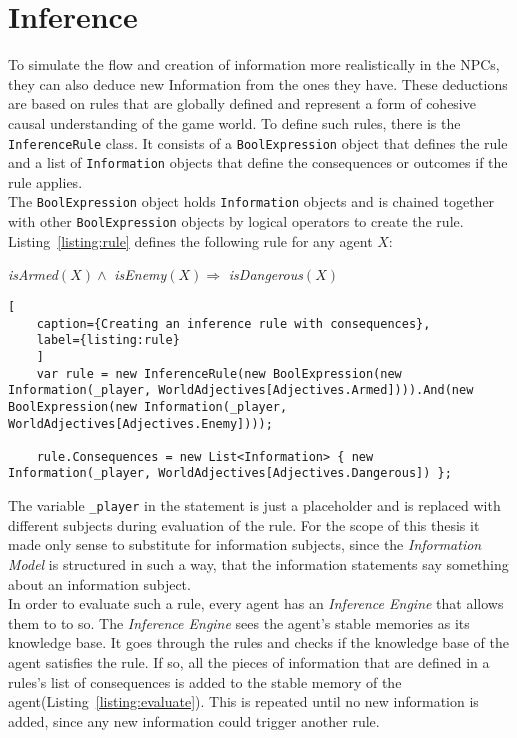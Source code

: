 \section{Inference}
To simulate the flow and creation of information more realistically in the NPCs, they can also deduce new Information from the ones they have. These deductions are based on rules that are globally defined and represent a form of cohesive causal understanding of the game world. To define such rules, there is the \verb|InferenceRule| class. It consists of a \verb|BoolExpression| object that defines the rule and a list of \verb|Information| objects that define the consequences or outcomes if the rule applies.\\
The \verb|BoolExpression| object holds \verb|Information| objects and is chained together with other \verb|BoolExpression| objects by logical operators to create the rule. Listing~\ref{listing:rule} defines the following rule for any agent $X$:
\begin{center}
	\textit{isArmed}$(X) \wedge $ \textit{isEnemy}$(X) \Rightarrow $ \textit{isDangerous}$(X)$ 
\end{center}
\begin{lstlisting}[
	caption={Creating an inference rule with consequences},
	label={listing:rule}
	]
	var rule = new InferenceRule(new BoolExpression(new Information(_player, WorldAdjectives[Adjectives.Armed]))).And(new BoolExpression(new Information(_player, WorldAdjectives[Adjectives.Enemy])));

	rule.Consequences = new List<Information> { new Information(_player, WorldAdjectives[Adjectives.Dangerous]) };
\end{lstlisting}
The variable \verb|_player| in the statement is just a placeholder and is replaced with different subjects during evaluation of the rule. For the scope of this thesis it made only sense to substitute for information subjects, since the \textit{Information Model} is structured in such a way, that the information statements say something about an information subject.\\
In order to evaluate such a rule, every agent has an \textit{Inference Engine} that allows them to to so. The \textit{Inference Engine} sees the agent's stable memories as its knowledge base. It goes through the rules and checks if the knowledge base of the agent satisfies the rule. If so, all the pieces of information that are defined in a rules's list of consequences is added to the stable memory of the agent(Listing~\ref{listing:evaluate}). This is repeated until no new information is added, since any new information could trigger another rule.\\
